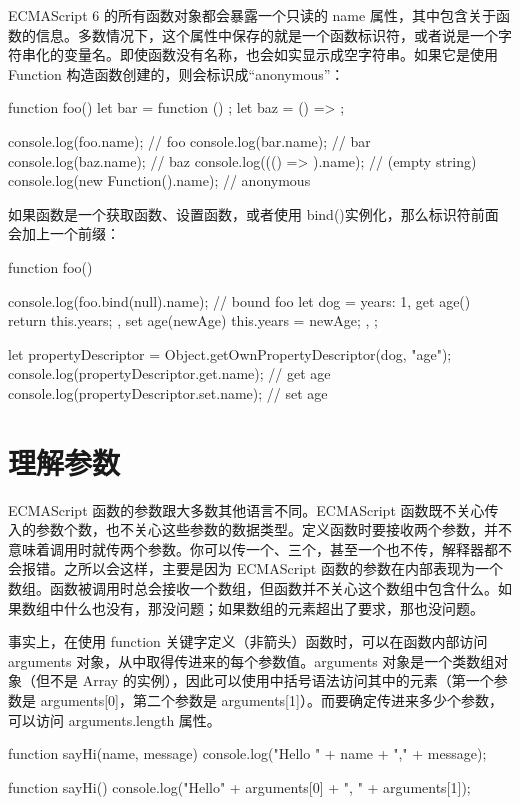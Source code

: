 ECMAScript 6 的所有函数对象都会暴露一个只读的 name 属性，其中包含关于函数的信息。多数情况下，这个属性中保存的就是一个函数标识符，或者说是一个字符串化的变量名。即使函数没有名称，也会如实显示成空字符串。如果它是使用 Function 构造函数创建的，则会标识成“anonymous”：
\begin{js}
function foo() {}
let bar = function () {};
let baz = () => {};

console.log(foo.name); // foo
console.log(bar.name); // bar
console.log(baz.name); // baz
console.log((() => {}).name); // (empty string)
console.log(new Function().name); // anonymous
\end{js}

如果函数是一个获取函数、设置函数，或者使用 bind()实例化，那么标识符前面会加上一个前缀：
\begin{js}
function foo() {}

console.log(foo.bind(null).name); // bound foo
let dog = {
  years: 1,
  get age() {
    return this.years;
  },
  set age(newAge) {
    this.years = newAge;
  },
};

let propertyDescriptor = Object.getOwnPropertyDescriptor(dog, "age");
console.log(propertyDescriptor.get.name); // get age
console.log(propertyDescriptor.set.name); // set age
\end{js}

\section{理解参数}
ECMAScript 函数的参数跟大多数其他语言不同。ECMAScript 函数既不关心传入的参数个数，也不关心这些参数的数据类型。定义函数时要接收两个参数，并不意味着调用时就传两个参数。你可以传一个、三个，甚至一个也不传，解释器都不会报错。之所以会这样，主要是因为 ECMAScript 函数的参数在内部表现为一个数组。函数被调用时总会接收一个数组，但函数并不关心这个数组中包含什么。如果数组中什么也没有，那没问题；如果数组的元素超出了要求，那也没问题。

事实上，在使用 function 关键字定义（非箭头）函数时，可以在函数内部访问 arguments 对象，从中取得传进来的每个参数值。arguments 对象是一个类数组对象（但不是 Array 的实例），因此可以使用中括号语法访问其中的元素（第一个参数是 arguments[0]，第二个参数是 arguments[1]）。而要确定传进来多少个参数，可以访问 arguments.length 属性。

\begin{js}
function sayHi(name, message) {
  console.log("Hello " + name + "," + message);
}

function sayHi() {
  console.log("Hello" + arguments[0] + ", " + arguments[1]);
}
\end{js}

